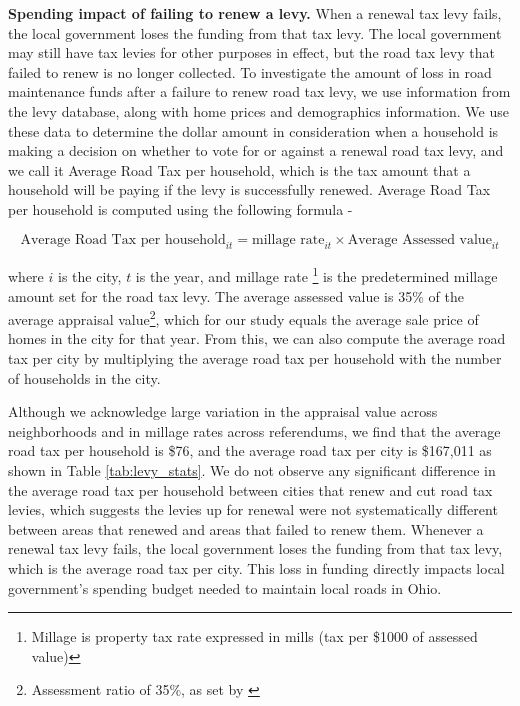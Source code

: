 {\bf Spending impact of failing to renew a levy.} When a renewal tax levy fails, the local government loses the funding from that tax levy. The local government may still have tax levies for other purposes in effect, but the road tax levy that failed to renew is no longer collected. To investigate the amount of loss in road maintenance funds after a failure to renew road tax levy, we use information from the levy database, along with home prices and demographics information. We use these data to determine the dollar amount in consideration when a household is making a decision on whether to vote for or against a renewal road tax levy, and we call it Average Road Tax per household, which is the tax amount that a household will be paying if the levy is successfully renewed. Average Road Tax per household is computed using the following formula -

\begin{equation}
\text{Average Road Tax per household}_{it} = \text{millage rate}_{it} \times \text{Average Assessed value}_{it}
\end{equation}

where $i$ is the city, $t$ is the year, and millage rate \footnote{Millage is property tax rate expressed in mills (tax per \$1000 of assessed value)} is the predetermined millage amount set for the road tax levy. The average assessed value is 35\% of the average appraisal value\footnote{Assessment ratio of 35\%, as set by \cite{OhioRealPropertyTax}}, which for our study equals the average sale price of homes in the city for that year. From this, we can also compute the average road tax per city by multiplying the average road tax per household with the number of households in the city.

Although we acknowledge large variation in the appraisal value across neighborhoods and in millage rates across referendums, we find that the average road tax per household is \$76, and the average road tax per city is \$167,011 as shown in Table \ref{tab:levy_stats}. We do not observe any significant difference in the average road tax per household between cities that renew and cut road tax levies, which suggests the levies up for renewal were not systematically different between areas that renewed and areas that failed to renew them. Whenever a renewal tax levy fails, the local government loses the funding from that tax levy, which is the average road tax per city. This loss in funding directly impacts local government's spending budget needed to maintain local roads in Ohio.

